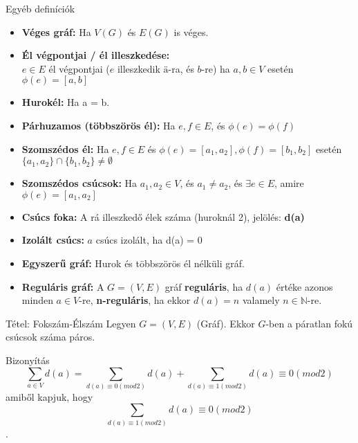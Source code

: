 \documentclass{beamer}
\begin{document}
\begin{frame}

\begin{block}{Egyéb definíciók}
\begin{itemize}
\item \textbf{Véges gráf:} Ha $V(G)$ és $E(G)$ is véges.
\item \textbf{Él végpontjai / él illeszkedése:}\\
$e \in E$ él végpontjai ($e$ illeszkedik $ä$-ra, és $b$-re) ha $a, b \in V$ esetén ${\phi}(e) = [a, b]$
\item \textbf{Hurokél:} Ha a = b.
\item \textbf{Párhuzamos (többszörös él):} Ha $e, f \in E$, és ${\phi}(e) = {\phi}(f)$
\item \textbf{Szomszédos él:} Ha $e, f \in E$ és ${\phi}(e) = [a_1, a_2], {\phi}(f) = [b_1, b_2]$ esetén $\{a_1, a_2\} \cap \{b_1, b_2\} \neq \emptyset$
\item \textbf{Szomszédos csúcsok:} Ha $a_1, a_2 \in V$, és $a_1 \neq a_2$, és ${\exists}e \in E$, amire ${\phi}(e) = [a_1, a_2]$
\item \textbf{Csúcs foka:} A rá illeszkedő élek száma (huroknál 2), jelölés: \textbf{d(a)}
\item \textbf{Izolált csúcs:} $a$ csúcs izolált, ha d(a) = 0
\item \textbf{Egyszerű gráf:} Hurok és többszörös él nélküli gráf.
\item \textbf{Reguláris gráf:} A $G = (V, E)$ gráf \textbf{reguláris}, ha $d(a)$ értéke azonos minden $a \in V$-re, \textbf{n-reguláris}, ha ekkor $d(a) = n$ valamely $n \in \mathbb{N}$-re.
\end{itemize}
\end{block}

\end{frame}

\begin{frame}

\begin{block}{Tétel: Fokszám-Élszám}
Legyen $G = (V, E)$ (Gráf). Ekkor $G$-ben a páratlan fokú csúcsok száma páros.

\end{block}

\begin{block}{Bizonyítás}
$$\sum_{a \in V} d(a) = \sum_{d(a) \equiv 0 (mod 2)} d(a) + \sum_{d(a) \equiv 1 (mod 2)} d(a) \equiv 0 (mod 2)$$
amiből kapjuk, hogy $$\sum_{d(a) \equiv 1 (mod 2)} d(a) \equiv 0 (mod 2)$$.

\end{block}

\end{frame}
\end{document}
